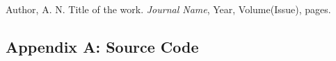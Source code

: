 \documentclass[withoutpreface,bwprint]{cumcm} %
\begin{document}
\begin{thebibliography}{9}
    Author, A. N.
    \newblock Title of the work.
    \newblock \emph{Journal Name}, Year, Volume(Issue), pages.
\end{thebibliography}

\begin{appendices}
\section{Appendix A: Source Code}
\end{appendices}
\end{document}
